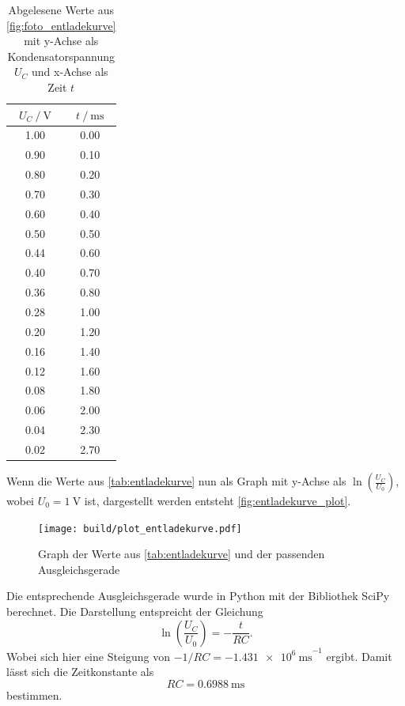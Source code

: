 \begin{table}
    \centering
    \caption{Abgelesene Werte aus \autoref{fig:foto_entladekurve} mit y-Achse als Kondensatorspannung $U_C$ und x-Achse als Zeit $t$}
    \label{tab:entladekurve}
    \begin{tabular}{c c}
        \toprule
        $U_C \:/\: \si{\volt}$ & $t \:/\: \si{\milli\second}$ \\
        \midrule
        1.00 & 0.00 \\
        0.90 & 0.10 \\
        0.80 & 0.20 \\
        0.70 & 0.30 \\
        0.60 & 0.40 \\
        0.50 & 0.50 \\
        0.44 & 0.60 \\
        0.40 & 0.70 \\
        0.36 & 0.80 \\
        0.28 & 1.00 \\
        0.20 & 1.20 \\
        0.16 & 1.40 \\
        0.12 & 1.60 \\
        0.08 & 1.80 \\
        0.06 & 2.00 \\
        0.04 & 2.30 \\
        0.02 & 2.70 \\
        \bottomrule
    \end{tabular}
\end{table}

Wenn die Werte aus \autoref{tab:entladekurve} nun als Graph mit y-Achse als $\ln\left( \frac{U_C}{U_0} \right)$, wobei $U_0=\SI{1}{\volt}$ ist, dargestellt werden entsteht \autoref{fig:entladekurve_plot}.

\begin{figure}
    \centering
    \texttt{[image: build/plot\_entladekurve.pdf]}
    \caption{Graph der Werte aus \autoref{tab:entladekurve} und der passenden Ausgleichsgerade}
    \label{fig:entladekurve_plot}
\end{figure}

Die entsprechende Ausgleichsgerade wurde in Python mit der Bibliothek SciPy berechnet.\cite{scipy}
Die Darstellung entspreicht der Gleichung 
\begin{equation}
    \ln\left(\frac{U_C}{U_0}\right) = -\frac{t}{RC}.
\end{equation}
Wobei sich hier eine Steigung von $-1/RC = \SI{-1.431e6}{\milli\second}^{-1}$ ergibt. 
Damit lässt sich die Zeitkonstante als 
\begin{equation}
    RC = \SI{0.6988}{\milli\second}
\end{equation}
bestimmen.

